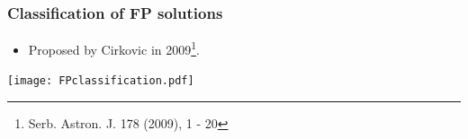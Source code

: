 
\begin{frame}
\frametitle{Classification of FP solutions}

\begin{itemize}
\item Proposed by Cirkovic in 2009\footnote{Serb. Astron. J.  178 (2009), 1 - 20}.
\end{itemize}

\texttt{[image: FPclassification.pdf]}

\end{frame}

